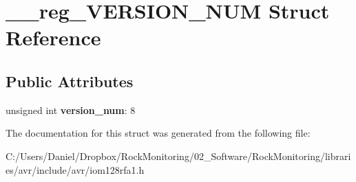 \hypertarget{struct____reg___v_e_r_s_i_o_n___n_u_m}{}\section{\+\_\+\+\_\+reg\+\_\+\+V\+E\+R\+S\+I\+O\+N\+\_\+\+N\+UM Struct Reference}
\label{struct____reg___v_e_r_s_i_o_n___n_u_m}
\subsection*{Public Attributes}
\begin{DoxyCompactItemize}
\item 
unsigned int {\bfseries version\+\_\+num}\+: 8\hypertarget{struct____reg___v_e_r_s_i_o_n___n_u_m_a468684d117ba25455a1b5ef0fd473c81}{}\label{struct____reg___v_e_r_s_i_o_n___n_u_m_a468684d117ba25455a1b5ef0fd473c81}

\end{DoxyCompactItemize}


The documentation for this struct was generated from the following file\+:\begin{DoxyCompactItemize}
\item 
C\+:/\+Users/\+Daniel/\+Dropbox/\+Rock\+Monitoring/02\+\_\+\+Software/\+Rock\+Monitoring/libraries/avr/include/avr/iom128rfa1.\+h\end{DoxyCompactItemize}
